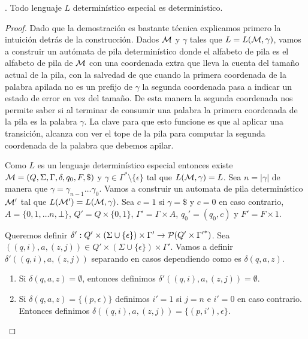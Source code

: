 \documentclass[tesis.tex]{subfiles}
\begin{document}
\begin{prop}\cite{CSSE2024DW}.
	Todo lenguaje $L$ \ic determinístico especial es \ic determinístico.
\end{prop}
\begin{proof}
	Dado que la demostración es bastante técnica explicamos primero la intuición detrás de la construcción. 
	Dados $\cal M$ y $\gamma$ tales que  $L = L({\cal{M}},\gamma)$, vamos a construir un autómata de pila determinístico donde el alfabeto de pila es el alfabeto de pila de $\cal M$ con una coordenada extra que lleva la cuenta del tamaño actual de la pila, con la salvedad de que cuando la primera coordenada de la palabra apilada no es un prefijo de $\gamma$ la segunda coordenada pasa a indicar un estado de error en vez del tamaño. 
	De esta manera la segunda coordenada nos permite saber si al terminar de consumir una palabra la primera coordenada de la pila es la palabra $\gamma$. 
	La clave para que esto funcione es que al aplicar una transición, alcanza con ver el tope de la pila para computar la segunda coordenada de la palabra que debemos apilar.



	Como $L$ es un lenguaje \ic determinístico especial entonces existe ${\cal M} = (Q,\Sigma, \Gamma, \delta, q_0, F, \$)$ \APD y $\gamma \in \Gamma^{*} \setminus \{ \epsilon \}$ tal que $L({\cal M}, \gamma) = L$.
	Sea $n = |\gamma|$ de manera que $\gamma = \gamma_{n-1} \dots \gamma_{0}$.
	Vamos a construir un automata de pila determinístico $\cal{M'}$ tal que $L({\cal{M}}') = L({\cal{M}},\gamma)$.
	Sea
	$c = 1$ si $\gamma = \$$ y $c = 0$ en caso contrario,
	$A = \{0, 1, \dots n, \bot\}$,
	$Q' = Q \times \{0,1\}$,
	$\Gamma' = \Gamma \times A$,
	$q_{0}' = (q_{0},c)$ y
	$F' = F \times {1}$.

	Queremos definir 
	$\delta' : Q' \times (\Sigma \cup \{\epsilon\}) \times \Gamma' \to {\cal P}( Q' \times {\Gamma'}^{*} )$.
	Sea $((q,i), a, (z,j)) \in Q' \times (\Sigma \cup \{ \epsilon \}) \times \Gamma'$. 
	Vamos a definir $\delta'((q,i), a, (z,j))$ separando en casos dependiendo como es $\delta(q,a,z)$.

	\begin{enumerate}
		\item Si $\delta(q,a,z) = \emptyset$, entonces definimos $\delta'( (q,i), a, (z,j) ) = \emptyset$.

		\item Si $\delta(q,a,z) = \{ (p, \epsilon) \}$ definimos $i' = 1$ si $j = n$ e $i' = 0$ en caso contrario. 
		Entonces definimos $\delta((q,i), a, (z,j)) = \{ (p,i'),\epsilon \}$.


\end{enumerate}
\end{proof}
\end{document}
